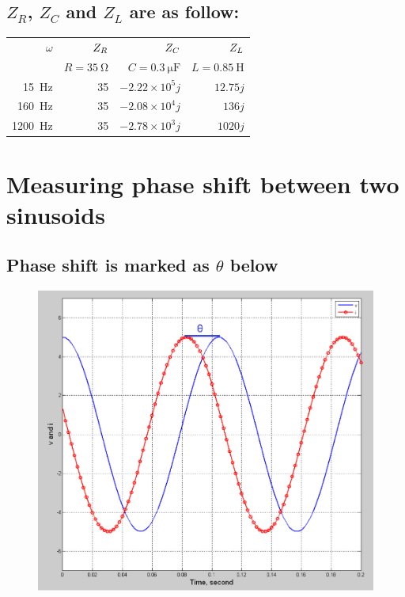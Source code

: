 \documentclass{article}
\begin{document}
\subsection{$Z_R$, $Z_C$ and $Z_L$ are as follow:}
\begin{table}[H]
    \centering
\begin{tabular}{rrrr}
\toprule
$\omega$ & $Z_{\small{R}}$ & $Z_{\small{C}}$ & $Z_{\small{L}}$ \\
& $R=\SI{35}{\ohm}$& $C=\SI{0.3}{\micro\farad}$& $L=\SI{0.85}{\henry}$
\\
\midrule
\SI{15}{\hertz}& 35 & $-2.22\times10^5j$ & $12.75j$ \\
\SI{160}{\hertz} & 35 & $-2.08\times10^4j$ & $136j$ \\
\SI{1200}{\hertz} & 35 & $-2.78\times10^3j$ & $1020j$ \\
\bottomrule
\end{tabular} 
\end{table}


\section{Measuring phase shift between two sinusoids}
\subsection{Phase shift is marked as $\theta$ below}
\begin{figure}[H]
    \centering
        \includegraphics[scale=0.45]{Capture.PNG}
\end{figure}
\end{document}
